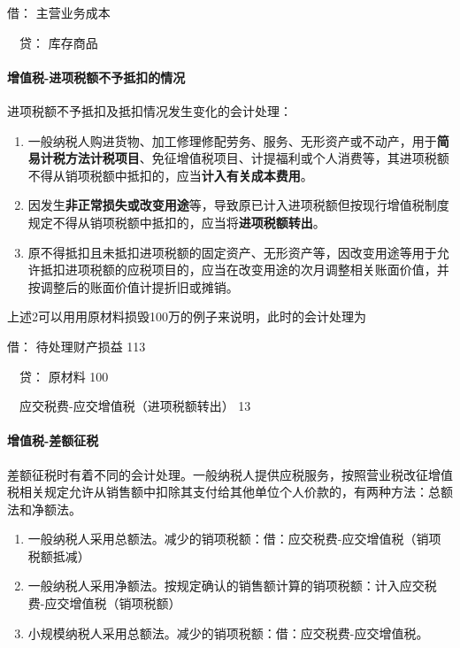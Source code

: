 \documentclass[UTF8,12pt]{ctexart}
\newenvironment{Dr}{\noindent 借：}{\par}
\newenvironment{Cr}{\noindent \ \ 贷：}{\par}
\numberwithin{equation}{section} %
\numberwithin{figure}{section}
\numberwithin{table}{section}
\begin{document}
	\begin{Dr}
		主营业务成本
	\end{Dr}
	\begin{Cr}
		库存商品
	\end{Cr}

	
	\paragraph{增值税-进项税额不予抵扣的情况}进项税额不予抵扣及抵扣情况发生变化的会计处理：
	\begin{enumerate}
		\item 一般纳税人购进货物、加工修理修配劳务、服务、无形资产或不动产，用于\textbf{简易计税方法计税项目}、免征增值税项目、计提福利或个人消费等，其进项税额不得从销项税额中抵扣的，应当\textbf{计入有关成本费用}。
		
		\item 因发生\textbf{非正常损失或改变用途}等，导致原已计入进项税额但按现行增值税制度规定不得从销项税额中抵扣的，应当将\textbf{进项税额转出}。
		
		\item 原不得抵扣且未抵扣进项税额的固定资产、无形资产等，因改变用途等用于允许抵扣进项税额的应税项目的，应当在改变用途的次月调整相关账面价值，并按调整后的账面价值计提折旧或摊销。
	\end{enumerate}

	上述2可以用用原材料损毁100万的例子来说明，此时的会计处理为
	
	\begin{Dr}
		待处理财产损益 113
	\end{Dr}
	\begin{Cr}
		原材料 100
		
		\ \ 应交税费-应交增值税（进项税额转出） 13
	\end{Cr}

	\paragraph{增值税-差额征税}差额征税时有着不同的会计处理。一般纳税人提供应税服务，按照营业税改征增值税相关规定允许从销售额中扣除其支付给其他单位个人价款的，有两种方法：总额法和净额法。
	
	\begin{enumerate}
		\item 一般纳税人采用总额法。减少的销项税额：借：应交税费-应交增值税（销项税额抵减）
		
		\item 一般纳税人采用净额法。按规定确认的销售额计算的销项税额：计入应交税费-应交增值税（销项税额）
		
		\item 小规模纳税人采用总额法。减少的销项税额：借：应交税费-应交增值税。
	\end{enumerate}
\end{document}
